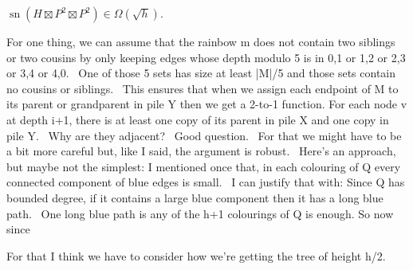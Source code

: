 \documentclass[kpfonts]{patmorin}
\DeclareMathOperator{\sn}{sn}
\begin{document}
\begin{lem}
    $\sn(H\boxtimes P^2\boxtimes P^2) \in \Omega(\sqrt{h})$.
\end{lem}


For one thing, we can assume that the rainbow m does not contain two siblings or two cousins by only keeping edges whose depth modulo 5 is in {0,1} or {1,2} or {2,3} or {3,4} or {4,0}.  One of those 5 sets has size at least |M|/5 and those sets contain no cousins or siblings.  This ensures that when we assign each endpoint of M to its parent or grandparent in pile Y then we get a 2-to-1 function.
For each node v at depth i+1, there is at least one copy of its parent in pile X and one copy in pile Y.  Why are they adjacent?  Good question.  For that we might have to be a bit more careful but, like I said, the argument is robust.  Here's an approach, but maybe not the simplest:
I mentioned once that, in each colouring of Q every connected component of blue edges is small.  I can justify that with: Since Q has bounded degree, if it contains a large blue component then it has a long blue path.  One long blue path is any of the h+1 colourings of Q is enough.
So now since 


For that I think we have to consider how we're getting the tree of height h/2.  
\end{document}
